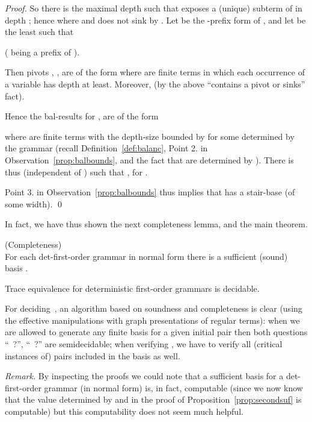 \documentclass[12pt]{article}
\begin{document}
\begin{proof}
So there is the maximal depth  such that  exposes
a (unique) subterm  of  in depth ; hence
 where  and 
 does not sink by .
Let   be the -prefix form of
, and let  be the least such that 

( being a prefix of ).

Then pivots , , are of the form 
  where  are finite terms in which
 each occurrence 
 of a variable has depth 
 at least. Moreover,  (by the above ``contains a pivot or sinks'' fact).
 
 Hence
the bal-results  for , 
are of the form
 
where  are finite terms with the depth-size bounded by
 for some  determined by
the grammar  (recall Definition~\ref{def:balanc}, Point 2. in
Observation~\ref{prop:balbounds}, and the fact that 
 are determined by
).
There is thus 
(independent of ) such that 
, for . 

Point 3. in
Observation~\ref{prop:balbounds} thus
implies that  has a
stair-base (of some width).
\qed
\end{proof}

\noindent
In fact, we have thus shown the next completeness
lemma, and the main theorem.

\begin{lemma}\label{lem:completeness1} (Completeness)
\\
For each det-first-order grammar  in normal form
there is a sufficient (sound) basis .
\end{lemma}





\begin{theorem}\label{th:tracedecid}
Trace
equivalence for deterministic
first-order grammars 
is decidable. 
\end{theorem}
For deciding \,, 
an algorithm based on soundness and completeness is clear
(using the effective manipulations with graph 
presentations of regular terms): when we
are allowed to generate any finite basis for a given initial pair
 then both questions ``~?'', 
``~?'' are semidecidable; when verifying ,
we have to verify all (critical instances of) pairs included in the basis as well.

\emph{Remark.} By inspecting the proofs we could note that a sufficient
basis for a det-first-order grammar (in normal form) is, in fact,
computable (since we now know that
the value  determined by  and  in
the proof of Proposition~\ref{prop:secondsuf} is computable) 
but this
computability does not seem much helpful.
\end{document}
